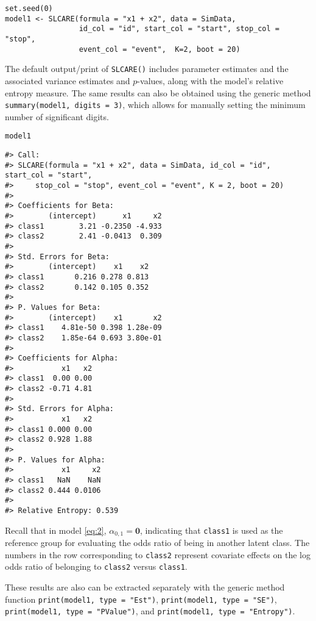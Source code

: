 \begin{verbatim}
set.seed(0)
model1 <- SLCARE(formula = "x1 + x2", data = SimData,
                 id_col = "id", start_col = "start", stop_col = "stop", 
                 event_col = "event",  K=2, boot = 20)
\end{verbatim}

The default output/print of \texttt{SLCARE()} includes parameter estimates and the associated variance estimates and \(p\)-values, along with the model's relative entropy measure. The same results can also be obtained using the generic method \texttt{summary(model1,\ digits\ =\ 3)}, which allows for manually setting the minimum number of significant digits.

\begin{verbatim}
model1
\end{verbatim}

\begin{verbatim}
#> Call:
#> SLCARE(formula = "x1 + x2", data = SimData, id_col = "id", start_col = "start", 
#>     stop_col = "stop", event_col = "event", K = 2, boot = 20)
#> 
#> Coefficients for Beta:
#>        (intercept)      x1     x2
#> class1        3.21 -0.2350 -4.933
#> class2        2.41 -0.0413  0.309
#> 
#> Std. Errors for Beta:
#>        (intercept)    x1    x2
#> class1       0.216 0.278 0.813
#> class2       0.142 0.105 0.352
#> 
#> P. Values for Beta:
#>        (intercept)    x1       x2
#> class1    4.81e-50 0.398 1.28e-09
#> class2    1.85e-64 0.693 3.80e-01
#> 
#> Coefficients for Alpha:
#>           x1   x2
#> class1  0.00 0.00
#> class2 -0.71 4.81
#> 
#> Std. Errors for Alpha:
#>           x1   x2
#> class1 0.000 0.00
#> class2 0.928 1.88
#> 
#> P. Values for Alpha:
#>           x1     x2
#> class1   NaN    NaN
#> class2 0.444 0.0106
#> 
#> Relative Entropy: 0.539
\end{verbatim}

Recall that in model \eqref{eq:2}, \(\alpha_{0,1} = \textbf{0}\), indicating that \texttt{class1} is used as the reference group for evaluating the odds ratio of being in another latent class. The numbers in the row corresponding to \texttt{class2} represent covariate effects on the log odds ratio of belonging to \texttt{class2} versus \texttt{class1}.

These results are also can be extracted separately with the generic method function \texttt{print(model1,\ type\ =\ "Est")}, \texttt{print(model1,\ type\ =\ "SE")}, \texttt{print(model1,\ type\ =\ "PValue")}, and \texttt{print(model1,\ type\ =\ "Entropy")}.

